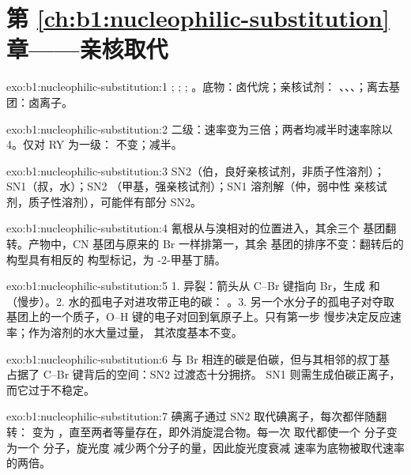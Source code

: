 \section*{第 \ref{ch:b1:nucleophilic-substitution} 章——亲核取代}

\begin{solution}{exo:b1:nucleophilic-substitution:1}
; ; ;
。底物：卤代烷；亲核试剂：
、、、；离去基团：卤离子。
\end{solution}

\begin{solution}{exo:b1:nucleophilic-substitution:2}
二级：速率变为三倍；两者均减半时速率除以 4。仅对 RY 为一级：
不变；减半。
\end{solution}

\begin{solution}{exo:b1:nucleophilic-substitution:3}
SN2（伯，良好亲核试剂，非质子性溶剂）；SN1（叔，水）；SN2
（甲基，强亲核试剂）；SN1 溶剂解（仲，弱中性
亲核试剂，质子性溶剂），可能伴有部分 SN2。
\end{solution}

\begin{solution}{exo:b1:nucleophilic-substitution:4}
氰根从与溴相对的位置进入，其余三个
基团翻转。产物中，CN 基团与原来的 Br 一样排第一，其余
基团的排序不变：翻转后的构型具有相反的
构型标记，为 -2-甲基丁腈。
\end{solution}

\begin{solution}{exo:b1:nucleophilic-substitution:5}
1. 异裂：箭头从 C--Br 键指向 Br，生成  和
（慢步）。2. 水的孤电子对进攻带正电的碳：
。3. 另一个水分子的孤电子对夺取
 基团上的一个质子，O--H 键的电子对回到氧原子上。只有第一步
慢步决定反应速率；作为溶剂的水大量过量，
其浓度基本不变。
\end{solution}

\begin{solution}{exo:b1:nucleophilic-substitution:6}
与 Br 相连的碳是伯碳，但与其相邻的叔丁基
占据了 C--Br 键背后的空间：SN2 过渡态十分拥挤。
SN1 则需生成伯碳正离子，而它过于不稳定。
\end{solution}

\begin{solution}{exo:b1:nucleophilic-substitution:7}
碘离子通过 SN2 取代碘离子，每次都伴随翻转： 变为
，直至两者等量存在，即外消旋混合物。每一次
取代都使一个  分子变为一个  分子，旋光度
减少两个分子的量，因此旋光度衰减
速率为底物被取代速率的两倍。
\end{solution}


